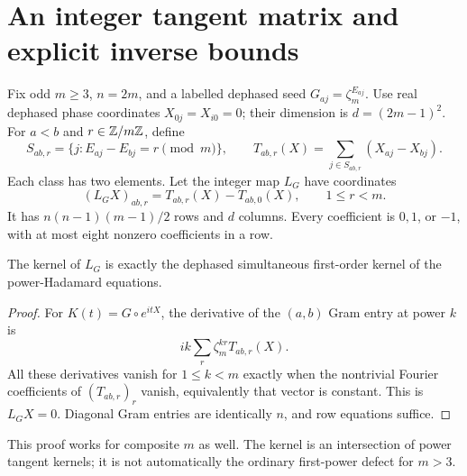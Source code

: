 \section{An integer tangent matrix and explicit inverse bounds}\label{sec:integer}
Fix odd $m\ge3$, $n=2m$, and a labelled dephased seed $G_{aj}=\zeta_m^{E_{aj}}$. Use real dephased phase coordinates $X_{0j}=X_{i0}=0$; their dimension is $d=(2m-1)^2$. For $a<b$ and $r\in\mathbb Z/m\mathbb Z$, define
\[
 S_{ab,r}=\{j:E_{aj}-E_{bj}=r\pmod m\},\qquad
 T_{ab,r}(X)=\sum_{j\in S_{ab,r}}(X_{aj}-X_{bj}).
\]
Each class has two elements. Let the integer map $L_G$ have coordinates
\[
 (L_GX)_{ab,r}=T_{ab,r}(X)-T_{ab,0}(X),\qquad1\le r<m.
\]
It has $n(n-1)(m-1)/2$ rows and $d$ columns. Every coefficient is $0,1$, or $-1$, with at most eight nonzero coefficients in a row.

\begin{lemma}\label{lem:integer-kernel}
The kernel of $L_G$ is exactly the dephased simultaneous first-order kernel of the power-Hadamard equations.
\end{lemma}
\begin{proof}
For $K(t)=G\circ e^{itX}$, the derivative of the $(a,b)$ Gram entry at power $k$ is
\[
 ik\sum_r\zeta_m^{kr}T_{ab,r}(X).
\]
All these derivatives vanish for $1\le k<m$ exactly when the nontrivial Fourier coefficients of $(T_{ab,r})_r$ vanish, equivalently that vector is constant. This is $L_GX=0$. Diagonal Gram entries are identically $n$, and row equations suffice.
\end{proof}
This proof works for composite $m$ as well. The kernel is an intersection of power tangent kernels; it is not automatically the ordinary first-power defect for $m>3$.

